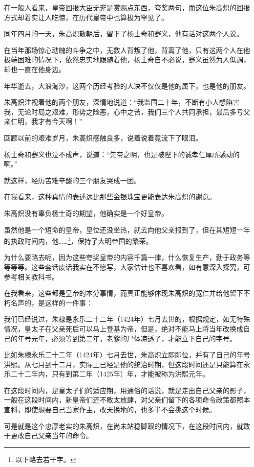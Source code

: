 \begin{multicols}{\theparacolNo}
在一般人看来，皇帝回报大臣无非是赏赐点东西，夸奖两句，而这位朱高炽的回报方式却着实让人吃惊，在历代皇帝中也算极为罕见了。

同年四月的一天，朱高炽散朝后，留下了杨士奇和蹇义，他有话对这两个人说。

在当年那场惊心动魄的斗争之中，无数人背叛了他，背离了他，只有这两个人在他极端困难的情况下，依然忠实地跟随着他，杨士奇自不必说，蹇义虽然为人低调，却也一直在他身边。

年华逝去，大浪淘沙，这两个历经考验的人决不仅仅是他的属下，也是他的朋友。

朱高炽注视着他的两个朋友，深情地说道：“我监国二十年，不断有小人想陷害我，无论时局之艰难，形势之险恶，心中之苦，我们三个人共同承担，最后多亏父亲仁明，我才有今天啊！”

回顾以前的艰难岁月，朱高炽感触良多，说着说着竟流下了眼泪。

杨士奇和蹇义也泣不成声，说道：“先帝之明，也是被陛下的诚孝仁厚所感动的啊。”

就这样，经历苦难辛酸的三个朋友哭成一团。

在我看来，这种真情的表述远比那些金银珠宝更能表达朱高炽的谢意。

朱高炽没有辜负杨士奇的期望，他确实是一个好皇帝。

虽然他是一个短命的皇帝，皇位还没坐热，就去向他父亲报到了，但在其短短一年的执政时间内，他……\footnote{以下略去若干字。}，保持了大明帝国的繁荣。

为什么要略去呢，因为这些夸奖皇帝的内容千篇一律，什么恢复生产，勤于政务等等等等。这些套话废话我实在不愿写，大家估计也不喜欢看，如有意深入探究，可参考相关教科书。

在我看来，这些都是皇帝的本分事情，而真正能够体现朱高炽的宽仁并给他留下不朽名声的，是这样的一件事：

我们已经说过，朱棣是永乐二十二年（1424年）七月去世的，根据规定，如无特殊情况，皇太子在父亲死后可以马上登基为帝，但是，绝对不能马上将当年改换成自己的年号元年，必须等到第二年，老爹的尸体凉透了，才能立下自己的字号。

比如朱棣永乐二十二年（1424年）七月去世，朱高炽立即即位，并有了自己的年号洪熙。从七月到十二月，实际上已经是他的统治时期，但这段时间还是只能算在永乐二十二年内，只有到第二年（1425年）年，才能被称为洪熙元年。

在这段时间内，是皇太子们的适应期，用通俗的话说，就是走出自己父亲的影子，一般在这段时间内，新皇帝们还不敢太放肆，对父亲们留下的各项命令政策都照本宣科，即使想要自己当家作主，改天换地的，也多半不会挑这个时候。

可是就是这个忠厚老实的朱高炽，在尚未站稳脚跟的情况下，在这段时间内，就敢于更改自己父亲当年的命令。


\end{multicols}
